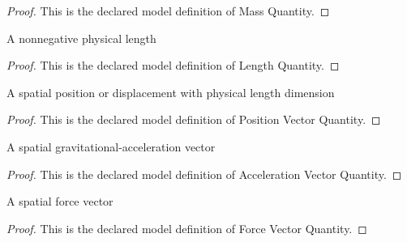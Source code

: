 \begin{proof}
  This is the declared model definition of Mass Quantity.
\end{proof}
\begin{definition}
  \label{def:physics:phyx-mini-0702:phyxminiproblems-problemphyxmini0702-lengthquantity}
  A nonnegative physical length
\end{definition}
\begin{proof}
  This is the declared model definition of Length Quantity.
\end{proof}
\begin{definition}
  \label{def:physics:phyx-mini-0702:phyxminiproblems-problemphyxmini0702-positionvectorquantity}
  A spatial position or displacement with physical length dimension
\end{definition}
\begin{proof}
  This is the declared model definition of Position Vector Quantity.
\end{proof}
\begin{definition}
  \label{def:physics:phyx-mini-0702:phyxminiproblems-problemphyxmini0702-accelerationvectorquantity}
  A spatial gravitational-acceleration vector
\end{definition}
\begin{proof}
  This is the declared model definition of Acceleration Vector Quantity.
\end{proof}
\begin{definition}
  \label{def:physics:phyx-mini-0702:phyxminiproblems-problemphyxmini0702-forcevectorquantity}
  A spatial force vector
\end{definition}
\begin{proof}
  This is the declared model definition of Force Vector Quantity.
\end{proof}
